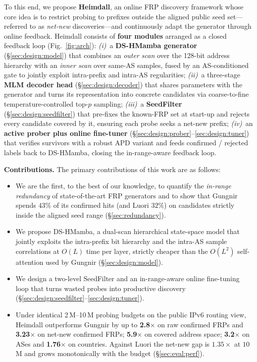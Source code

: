 \documentclass[conference]{IEEEtran}
\begin{document}
To this end, we propose \textbf{Heimdall}, an online FRP discovery
framework whose core idea is to restrict probing to prefixes
outside the aligned public seed set---referred to as \emph{net‑new} discoveries---and continuously adapt the
generator through online feedback.  Heimdall consists of
\textbf{four modules} arranged as a closed feedback loop
(Fig.~\ref{fig:arch}):
\emph{(i)}~a \textbf{DS-HMamba generator}
(\S\ref{sec:design:model}) that combines an \emph{outer scan}
over the 128-bit address hierarchy with an \emph{inner scan} over
same-AS samples, fused by an AS-conditioned gate to jointly
exploit intra-prefix and intra-AS regularities;
\emph{(ii)}~a three-stage \textbf{MLM decoder head}
(\S\ref{sec:design:decoder}) that shares parameters with the
generator and turns its representation into concrete candidates
via coarse-to-fine temperature-controlled top-$p$ sampling;
\emph{(iii)}~a \textbf{SeedFilter}
(\S\ref{sec:design:seedfilter}) that pre-fixes the known-FRP
set at start-up and rejects every candidate covered by it,
ensuring each probe seeks a net-new prefix;
\emph{(iv)}~an \textbf{active prober plus online fine-tuner}
(\S\ref{sec:design:prober}--\ref{sec:design:tuner}) that
verifies survivors with a robust APD variant and feeds
confirmed / rejected labels back to DS-HMamba, closing the
in-range-aware feedback loop.

\smallskip\textbf{Contributions.}
The primary contributions of this work are as follows:
\begin{itemize}
    \item We are the first, to the best of our knowledge, to
    quantify the \emph{in-range redundancy} of state-of-the-art FRP
    generators and to show that Gungnir spends $43\%$ of its confirmed
    hits (and Luori $32\%$) on candidates strictly inside the aligned
    seed range (\S\ref{sec:redundancy}).
    \item We propose DS-HMamba, a dual-scan hierarchical state-space
    model that jointly exploits the intra-prefix bit hierarchy and
    the intra-AS sample correlations at $O(L)$ time per layer,
    strictly cheaper than the $O(L^2)$ self-attention used by
    Gungnir (\S\ref{sec:design:model}).
    \item We design a two-level SeedFilter and an in-range-aware
    online fine-tuning loop that turns wasted probes into productive
    discovery (\S\ref{sec:design:seedfilter}--\ref{sec:design:tuner}).
    \item Under identical 2\,M--10\,M probing budgets on the
    public IPv6 routing view, Heimdall outperforms Gungnir by up to
    \textbf{2.8$\times$} on raw confirmed FRPs and
    \textbf{3.23$\times$} on net-new confirmed FRPs;
    \textbf{5.9$\times$} on covered address space; \textbf{3.2$\times$}
    on ASes and \textbf{1.76$\times$} on countries.  Against Luori
    the net-new gap is $\mathbf{1.35\times}$ at $10$M and grows
    monotonically with the budget (\S\ref{sec:eval:perf}).
\end{itemize}
\end{document}
